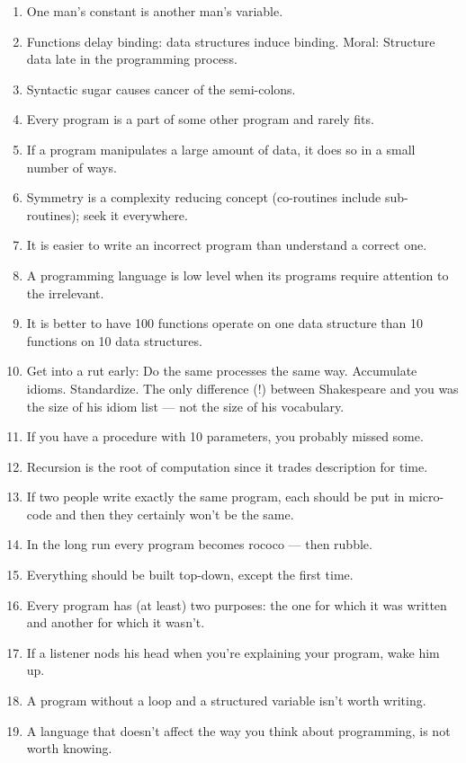 \documentclass[letterpaper,11pt]{article}
\begin{document}
\begin{multicols}{2}
\begin{enumerate}[wide=0pt,label=\textbf{\arabic*.}]
\item One man's constant is another man's variable.
\item Functions delay binding: data structures induce binding.
Moral: Structure data late in the programming process.
\item Syntactic sugar causes cancer of the semi-colons.
\item Every program is a part of some other program and rarely fits.
\item If a program manipulates a large amount of data,
it does so in a small number of ways.
\item Symmetry is a complexity reducing concept (co-routines include sub-routines); seek it everywhere.
\item It is easier to write an incorrect program than understand a correct one.
\item A programming language is low level when its programs require attention to the irrelevant.
\item It is better to have 100 functions operate on one data structure than 10 functions on 10 data structures.
\item Get into a rut early: Do the same processes the same way. Accumulate idioms. Standardize. The only difference (!) between Shakespeare and you was the size of his idiom list --- not the size of his vocabulary.
\item If you have a procedure with 10 parameters, you probably missed some.
\item Recursion is the root of computation since it trades description for time.
\item If two people write exactly the same program, each should be put in micro-code and then they certainly won't be the same.
\item In the long run every program becomes rococo --- then rubble.
\item Everything should be built top-down, except the first time.
\item Every program has (at least) two purposes: the one for which it was written and another for which it wasn't.
\item If a listener nods his head when you're explaining your program, wake him up.
\item A program without a loop and a structured variable isn't worth writing.
\item A language that doesn't affect the way you think about programming, is not worth knowing.

\end{enumerate}
\end{multicols}
\end{document}
